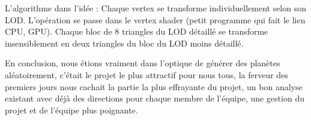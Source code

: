 \documentclass[12pt]{report}
\begin{document}
L’algorithme dans l’idée :
Chaque vertex se transforme individuellement selon son LOD. L’opération se passe dans le vertex shader (petit programme qui fait le lien CPU, GPU). Chaque bloc de 8 triangles du LOD détaillé se transforme insensiblement en deux triangles du bloc du LOD moins détaillé.

En conclusion, nous étions vraiment dans l'optique de générer des planètes aléatoirement, c'était le projet le plus attractif pour nous tous, la ferveur des premiers jours nous cachait la partie la plus effrayante du projet, un bon analyse existant avec déjà des directions pour chaque membre de l'équipe, une gestion du projet et de l'équipe plus poignante.




\end{document}
